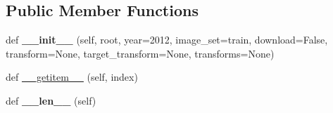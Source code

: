 \subsection*{Public Member Functions}
\begin{DoxyCompactItemize}
\item 
\mbox{\label{classtorchvision_1_1datasets_1_1voc_1_1VOCSegmentation_a763fbc3bfc4d21d3101ab1b1fc0c89a3}} 
def {\bfseries \+\_\+\+\_\+init\+\_\+\+\_\+} (self, root, year=\textquotesingle{}2012\textquotesingle{}, image\+\_\+set=\textquotesingle{}train\textquotesingle{}, download=False, transform=None, target\+\_\+transform=None, transforms=None)
\item 
def \hyperlink{classtorchvision_1_1datasets_1_1voc_1_1VOCSegmentation_ac703a73e9ba2fbf134fedee541f80f1d}{\+\_\+\+\_\+getitem\+\_\+\+\_\+} (self, index)
\item 
\mbox{\label{classtorchvision_1_1datasets_1_1voc_1_1VOCSegmentation_a6f40a5c3abbb3254166475fa6a51ce4a}} 
def {\bfseries \+\_\+\+\_\+len\+\_\+\+\_\+} (self)
\end{DoxyCompactItemize}
